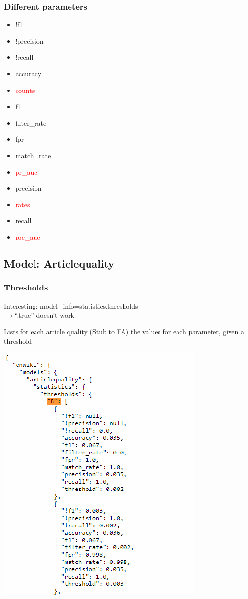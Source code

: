 \documentclass[12pt,a4paper]{article}
\begin{document}
\subsubsection{Different parameters}
\begin{itemize}
\item !f1
\item !precision
\item !recall
\item accuracy
\item \textcolor{red}{counts}
\item f1
\item filter\_rate
\item fpr
\item match\_rate
\item \textcolor{red}{pr\_auc}
\item precision
\item \textcolor{red}{rates}
\item recall
\item \textcolor{red}{roc\_auc}
\end{itemize}
\subsection{Model: Articlequality}
\subsubsection{Thresholds}
Interesting: model\_info=statistics.thresholds\\
$\rightarrow$``.true'' doesn't work
\begin{description}
\item Lists for each article quality (Stub to FA) the values for each parameter, given a threshold
\item \includegraphics[scale=0.6]{resources/2/ORESarticlequalityThresholds}
\end{description}
\end{document}
